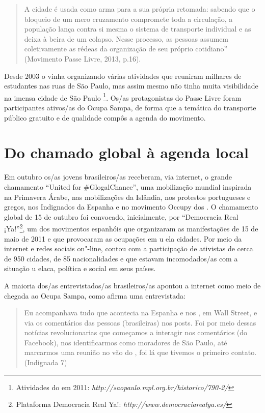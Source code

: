 \begin{quote}
A cidade é usada como arma para a sua própria retomada: sabendo que o
bloqueio de um mero cruzamento compromete toda a circulação, a população
lança contra si mesma o sistema de transporte individual e as deixa à
beira de um colapso. Nesse processo, as pessoas assumem coletivamente as
rédeas da organização de seu próprio cotidiano'' (Movimento Passe Livre,
2013, p.16).
\end{quote}

Desde 2003 o  vinha organizando várias atividades que reuniram
milhares de estudantes nas ruas de São Paulo, mas assim mesmo não tinha
muita visibilidade na imensa cidade de São Paulo \footnote{Atividades do
   em 2011: \emph{http://saopaulo.mpl.org.br/historico/790-2/}}. Os/as
protagonistas do Passe Livre foram participantes ativos/as do Ocupa
Sampa, de forma que a temática do transporte público gratuito e de
qualidade compôs a agenda do movimento.

\section{Do chamado global à agenda local}

Em outubro os/as jovens brasileiros/as receberam, via internet, o grande
chamamento ``United for \#GlogalChance'', uma mobilização mundial
inspirada na Primavera Árabe, nas mobilizações da Islândia, nos
protestos portugueses e gregos, nos Indignados da Espanha e no movimento
Occupy dos . O chamamento global de 15 de outubro foi convocado,
inicialmente, por ``Democracia Real ¡Ya!''\footnote{Plataforma
  Democracia Real Ya!: \emph{http://www.democraciarealya.es/}}, um dos
movimentos espanhóis que organizaram as manifestações de 15 de maio de
2011 e que provocaram as ocupações em u ela cidades. Por meio da
internet e redes sociais on"-line, contou com a participação de ativistas
de cerca de 950 cidades, de 85 nacionalidades e que estavam
incomodados/as com a situação u elaca, política e social em seus países.

A maioria dos/as entrevistados/as brasileiros/as apontou a internet como
meio de chegada ao Ocupa Sampa, como afirma uma entrevistada:

\begin{quote}
Eu acompanhava tudo que acontecia na Espanha e nos , em Wall Street,
e via os comentários das pessoas (brasileiras) nos posts. Foi por meio
dessas notícias revolucionarias que começamos a interagir nos
comentários (do Facebook), nos identificarmos como moradores de São
Paulo, até marcarmos uma reunião no vão do , foi lá que tivemos o
primeiro contato. (Indignada 7)
\end{quote}

